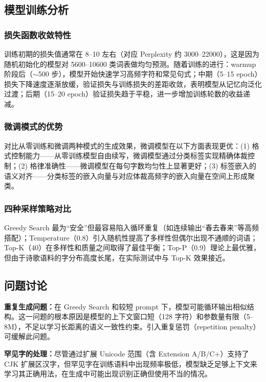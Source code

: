 \documentclass[a4paper, 12pt, centering, AutoFakeBold]{article}
\begin{document}
\subsection{模型训练分析}

\subsubsection{损失函数收敛特性}

训练初期的损失值通常在 8--10 左右（对应 Perplexity 约 3000--22000），这是因为随机初始化的模型对 5600--10600 类词表做均匀预测。随着训练的进行：warmup 阶段后（$\sim$500 步），模型开始快速学习高频字符和常见句式；中期（5--15 epoch）损失下降速度逐渐放缓，验证损失与训练损失的差距收敛，表明模型从记忆向泛化过渡；后期（15--20 epoch）验证损失趋于平稳，进一步增加训练轮数的收益递减。

\subsubsection{微调模式的优势}

对比从零训练和微调两种模式的生成效果，微调模型在以下方面表现更优：(1) 格式控制能力——从零训练模型自由续写，微调模型通过分类标签实现精确体裁控制；(2) 格律准确性——微调模型在每句字数均匀性上显著更好；(3) 标签嵌入的语义对齐——分类标签的嵌入向量与对应体裁高频字的嵌入向量在空间上形成聚类。

\subsubsection{四种采样策略对比}

Greedy Search 最为``安全''但最容易陷入循环重复（如连续输出``春去春来''等高频搭配）；Temperature（0.8）引入随机性提高了多样性但偶尔出现不通顺的词语；Top-K（40）在多样性和质量之间取得了最佳平衡；Top-P（0.9）理论上最优雅，但由于诗歌语料的字分布高度长尾，在实际测试中与 Top-K 效果接近。

\subsection{问题讨论}

\textbf{重复生成问题：}在 Greedy Search 和较短 prompt 下，模型可能循环输出相似结构。这一问题的根本原因是模型的上下文窗口短（128 字符）和参数量有限（5--8M），不足以学习长距离的语义一致性约束。引入重复惩罚（repetition penalty）可缓解此问题。

\textbf{罕见字的处理：}尽管通过扩展 Unicode 范围（含 Extension A/B/C+）支持了 CJK 扩展区汉字，但罕见字在训练语料中出现频率极低，模型缺乏足够上下文来学习其正确用法，在生成中可能出现识别正确但使用不当的情况。
\end{document}
